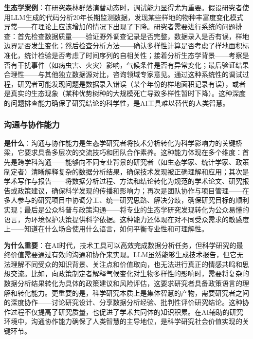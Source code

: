 \documentclass[
  twoside]{book}
\begin{document}
\textbf{生态学案例}：在研究森林群落演替动态时，调试能力显得尤为重要。假设研究者使用LLM生成的代码分析20年长期监测数据，发现某些样地的物种丰富度变化模式异常------在理论上应该增加的情况下出现了下降。研究者需要进行系统的问题排查：首先检查数据质量------验证野外调查记录是否完整，数据录入是否有误，样地边界是否发生变化；然后检查分析方法------确认多样性计算是否考虑了样地面积标准化，统计检验是否考虑了时间序列的自相关性；接着分析生态学背景------考察是否有干扰事件（如病虫害、火灾）影响，气候条件是否有异常变化；最后验证结果合理性------与其他独立数据源对比，咨询领域专家意见。通过这种系统性的调试过程，研究者可能发现问题是数据录入错误（某个年份的样地面积记录有误），或者是真实的生态现象（某种优势树种的大规模死亡导致多样性暂时下降）。这种深度的问题排查能力确保了研究结论的科学性，是AI工具难以替代的人类智慧。

\hypertarget{ux6c9fux901aux4e0eux534fux4f5cux80fdux529b}{%
\subsubsection{沟通与协作能力}\label{ux6c9fux901aux4e0eux534fux4f5cux80fdux529b}}

\textbf{是什么}：沟通与协作能力是生态学研究者将技术分析转化为科学影响力的关键桥梁，它要求具备多层次的交流技巧和团队合作素养。这种能力体现在多个维度：首先是跨学科沟通------能够向不同专业背景的研究者（如生态学家、统计学家、政策制定者）清晰解释复杂的数据分析结果，确保技术发现被正确理解和应用；其次是学术写作与报告------将数据分析过程、方法和结论转化为规范的学术论文、研究报告或政策建议，确保科学发现的传播和影响力；再次是团队协作与项目管理------在多人参与的研究项目中协调分工、统一研究思路、解决分歧，确保研究目标的顺利实现；最后是公众科普与政策沟通------将专业的生态学研究发现转化为公众易懂的语言，为环境保护决策提供科学依据。这种能力还体现在对不同受众需求的敏感度上------知道在什么场合使用什么语言，如何平衡专业性和可理解性。

\textbf{为什么重要}：在AI时代，技术工具可以高效完成数据分析任务，但科学研究的最终价值需要通过有效的沟通和协作来实现。LLM虽然能够生成技术报告，但它无法理解不同受众的知识背景、关注点和价值取向，也无法进行真正的情感共鸣和思想交流。比如，向政策制定者解释气候变化对生物多样性的影响时，需要将复杂的数据分析结果转化为具体的政策建议和风险评估，这要求研究者具备政策语言的理解和转化能力。更重要的是，科学研究本质上是集体智慧的产物，需要研究者之间的深度协作------讨论研究设计、分享数据分析经验、批判性评价研究结论。这种协作过程不仅提高了研究质量，也促进了学术共同体的知识积累。在AI辅助的研究环境中，沟通协作能力确保了人类智慧的主导地位，是科学研究社会价值实现的关键环节。
\end{document}
